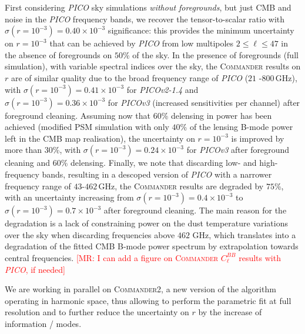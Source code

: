 \documentclass[PICOReport.tex]{subfiles}
\begin{document}
First considering \emph{PICO} sky simulations \emph{without foregrounds}, but just CMB and noise in the \emph{PICO} frequency bands,  we recover the tensor-to-scalar ratio with ${\sigma(r = 10^{-3}) = 0.40 \times 10^{-3}}$ significance: this provides the minimum uncertainty on ${r = 10^{-3}}$ that can be achieved by \emph{PICO} from low multipoles $2 \leq \ell \leq 47$ in the absence of foregrounds on $50$\% of the sky. In the presence of foregrounds (full simulation), with variable spectral indices over the sky, the \textsc{Commander} results on $r$ are of similar quality due to the broad frequency range of \emph{PICO} ($21$ -$800$\,GHz), with ${\sigma(r = 10^{-3}) = 0.41 \times 10^{-3}}$ for \emph{PICOv2-1.4} and ${\sigma(r = 10^{-3}) = 0.36 \times 10^{-3}}$ for \emph{PICOv3} (increased sensitivities per channel) after foreground cleaning. Assuming now that $60$\% delensing in power has been achieved (modified PSM simulation with only $40$\% of the lensing B-mode power left in the CMB map realisation), the uncertainty on ${r=10^{-3}}$ is improved by more than $30$\%, with ${\sigma(r = 10^{-3}) = 0.24 \times 10^{-3}}$ for \emph{PICOv3}  after foreground cleaning and $60$\% delensing. Finally, we note that discarding low- and high-frequency bands, resulting in a descoped version of \emph{PICO} with a narrower frequency range of $43$-$462$\,GHz, the \textsc{Commander} results are degraded by $75$\%, with an uncertainty  increasing from 
${\sigma(r = 10^{-3}) = 0.4 \times 10^{-3}}$  to ${\sigma(r = 10^{-3}) = 0.7 \times 10^{-3}}$ after foreground cleaning. The main reason for the degradation is a lack of constraining power on the dust temperature variations over the sky when discarding frequencies above $462$ GHz, which translates into a degradation of the fitted CMB B-mode power spectrum by extrapolation towards central frequencies. 
\newline\textcolor{red}{[MR: I can add a figure on \textsc{Commander} $C_\ell^{BB}$ results with \emph{PICO}, if needed]}

We are working in parallel on \textsc{Commander2}, a new version of the algorithm operating in harmonic space, thus allowing to perform the parametric fit at full resolution and to further reduce the uncertainty on $r$ by the increase of information / modes.
\end{document}
